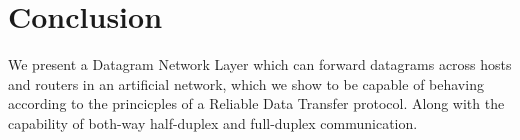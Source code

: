 \section{Conclusion}

We present a Datagram Network Layer which can forward datagrams across hosts and routers in an artificial network,
which we show to be capable of behaving according to the princicples of a Reliable Data Transfer protocol.
Along with the capability of both-way half-duplex and full-duplex communication.
